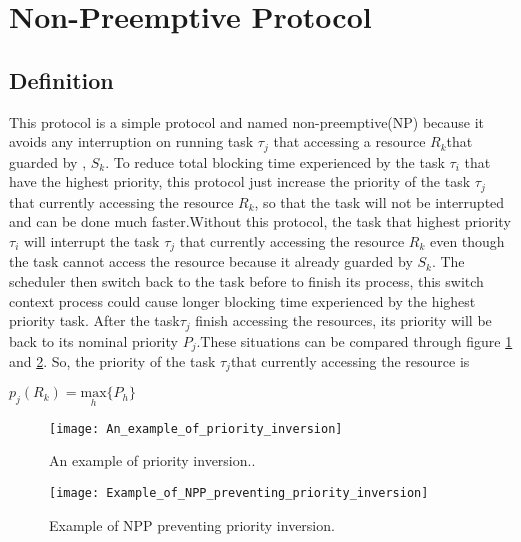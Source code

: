 \section{Non-Preemptive Protocol}

\subsection{Definition}

This protocol is a simple protocol and named non-preemptive(NP) because it avoids any interruption on running task $\tau_{j}$ that accessing a resource $ R_{k} $that guarded by , $ S_{k} $. To reduce total blocking time experienced by the task $\tau_{i}$ that have the highest priority, this protocol just increase the priority of the task $\tau_{j}$ that currently accessing the resource $ R_{k} $, so that the task will not be interrupted and can be done much faster.Without this protocol, the task that highest priority $\tau_{i}$ will interrupt the task $\tau_{j}$ that currently accessing the resource $ R_{k} $ even though the task cannot access the resource because it already guarded by $ S_{k} $. The scheduler then switch back to the task before to finish its process, this switch context process could cause longer blocking time experienced by the highest priority task. After the task$\tau_{j}$ finish accessing the resources, its priority will be back to its nominal priority $ P_{j} $.These situations can be compared through figure \ref{fig:An_example_of_priority_inversion} and \ref{fig:Example_of_NPP_preventing_priority_inversion}. So, the priority of the task $\tau_{j}$that currently accessing the resource is 

\begin{center}
$p_{j}(R_{k})=\underset{h}{\mathrm{max}} \{P_{h}\}  $ \cite{b5}

\end{center}

\begin{figure}[h]
    \centering
    \texttt{[image: An\_example\_of\_priority\_inversion]}
    \caption{An example of priority inversion.. \cite{b5}}
    \label{fig:An_example_of_priority_inversion}
\end{figure}

\begin{figure}[h]
    \centering
    \texttt{[image: Example\_of\_NPP\_preventing\_priority\_inversion]}
    \caption{Example of NPP preventing priority inversion. \cite{b5}}
    \label{fig:Example_of_NPP_preventing_priority_inversion}
\end{figure}



